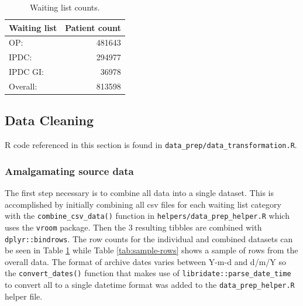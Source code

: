 \documentclass[
  12pt,
]{article}
\begin{document}
\begin{table}

\caption{\label{tab:waiting-list-counts}Waiting list counts.}
\centering
\begin{tabular}[t]{lr}
\toprule
Waiting list & Patient count\\
\midrule
OP: & 481643\\
IPDC: & 294977\\
IPDC GI: & 36978\\
\hline
Overall: & 813598\\
\bottomrule
\end{tabular}
\end{table}

\newpage

\hypertarget{data-cleaning}{%
\subsection{Data Cleaning}\label{data-cleaning}}

R code referenced in this section is found in \texttt{data\_prep/data\_transformation.R}.

\hypertarget{amalgamating-source-data}{%
\subsubsection{Amalgamating source data}\label{amalgamating-source-data}}

The first step necessary is to combine all data into a single dataset. This is accomplished by initially combining all csv files for each waiting list category with the \texttt{combine\_csv\_data()} function in \texttt{helpers/data\_prep\_helper.R} which uses the \texttt{vroom} package. Then the 3 resulting tibbles are combined with \texttt{dplyr::bindrows}. The row counts for the individual and combined datasets can be seen in Table \ref{tab:waiting-list-counts} while Table \ref{tab:sample-rows} shows a sample of rows from the overall data. The format of archive dates varies between Y-m-d and d/m/Y so the \texttt{convert\_dates()} function that makes use of \texttt{libridate::parse\_date\_time} to convert all to a single datetime format was added to the \texttt{data\_prep\_helper.R} helper file.
\end{document}
